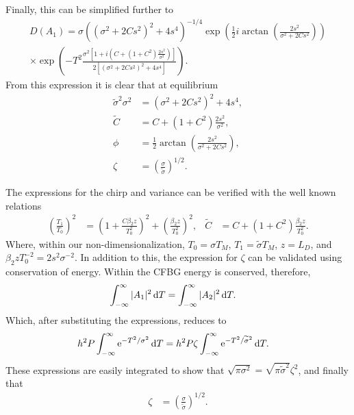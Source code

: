 Finally, this can be simplified further to
\begin{multline*}
D(A_1) = \sigma \left( \left( \sigma^2 + 2C s^2 \right)^2 + 4s^4 \right)^{-1/4} \exp \left( \frac{1}{2} i \arctan \left( \frac{2s^2}{\sigma^2 + 2C s^2} \right) \right) \\
\times \exp \left( -T^2 \frac{\sigma^2 \left[ 1 + i \left( C + (1 + C^2) \frac{2s^2}{\sigma^2} \right) \right]}{2 \left[ (\sigma^2 + 2C s^2)^2 + 4s^4 \right]} \right).
\end{multline*}
From this expression it is clear that at equilibrium
\begin{subequations}
\begin{align}
\label{eq:varout}
\widetilde{\sigma}^2 \sigma^2 &= \left( \sigma^2 + 2 C s^2 \right)^2 + 4s^4, \\
\label{eq:chirpout}
\widetilde{C} &= C + (1+C^2) \frac{2 s^2}{\sigma^2}, \\
\label{eq:phase}
\phi &= \frac{1}{2} \arctan \left( \frac{2s^2}{\sigma^2 + 2C s^2} \right), \\
\zeta &= \left( \frac{\sigma}{\widetilde{\sigma}} \right)^{1/2}.
\end{align}
\end{subequations}

The expressions for the chirp and variance can be verified with the well known relations \cite{agrawal2013, anderson, ferreira, silfvast}
\begin{align*}
\left( \frac{T_1}{T_0} \right)^2 &= \left( 1 + \frac{C \beta_2 z}{T_0^2} \right)^2 + \left( \frac{ \beta_2 z}{T_0^2} \right)^2,&
\widetilde{C} &= C + (1+C^2) \frac{\beta_2 z}{T_0^2}.
\end{align*}
Where, within our non-dimensionalization, $T_0 = \sigma T_M$, $T_1 = \widetilde{\sigma} T_M$, $z = L_D$, and $\beta_2 z T_0^{-2} = 2s^2\sigma^{-2}$. In addition to this, the expression for $\zeta$ can be validated using conservation of energy. Within the CFBG energy is conserved, therefore,
\begin{align*}
\int_{-\infty}^\infty |A_1|^2 \, \textrm{d} T &= \int_{-\infty}^\infty |A_2|^2 \, \textrm{d} T.
\end{align*}
Which, after substituting the expressions, reduces to
\begin{align*}
h^2 P \int_{-\infty}^\infty \textrm{e}^{-T^2/\sigma^2} \, \textrm{d} T &= h^2 P \zeta \int_{-\infty}^\infty \textrm{e}^{-T^2/\widetilde{\sigma}^2} \, \textrm{d} T.
\end{align*}
These expressions are easily integrated to show that $\sqrt{\pi \sigma^2} = \sqrt{\pi \widetilde{\sigma}^2} \zeta^2$, and finally that
\begin{align*}
\zeta &= \left( \frac{\sigma}{\widetilde{\sigma}} \right)^{1/2}.
\end{align*}






